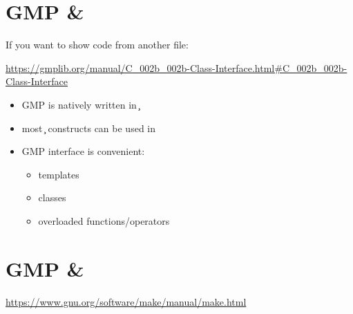 \section{GMP \& \cpp}

If you want to show code from another file:
\codes{}

\url{https://gmplib.org/manual/C_002b_002b-Class-Interface.html#C_002b_002b-Class-Interface}

\begin{itemize}
\item GMP is natively written in \c
\item most \c{} constructs can be used in \cpp
\item GMP \cpp{} interface is convenient:
  \begin{itemize}
  \item templates
  \item classes
  \item overloaded functions/operators
  \end{itemize}
\end{itemize}

\item \cite{gmp}


\section{GMP \& \make}

\url{https://www.gnu.org/software/make/manual/make.html}

\item \cite{make}

